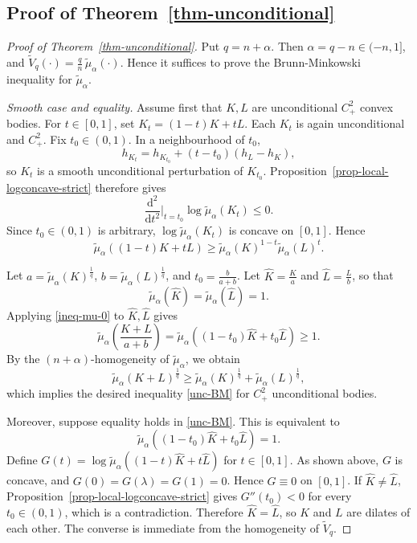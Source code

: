 \documentclass[12pt,leqno]{amsart}
\theoremstyle{plain} \newtheorem{thm}{Theorem}[section]
\theoremstyle{plain} \newtheorem{prop}[thm]{Proposition}
\theoremstyle{plain} \newtheorem{prob}[thm]{Problem}
\theoremstyle{definition} \newtheorem{defi}[thm]{Definition}
\theoremstyle{plain} \newtheorem{cor}[thm]{Corollary}
\theoremstyle{plain} \newtheorem{lem}[thm]{Lemma}
\theoremstyle{plain} \newtheorem{eg}{Example}[section]
\theoremstyle{remark} \newtheorem{rmk}[thm]{Remark}
\theoremstyle{plain} \newtheorem{conj}{Conjecture}
\numberwithin{equation}{section}
\newcommand{\tV}{\widetilde V}
\begin{document}
\subsection{Proof of Theorem~\ref{thm-unconditional}}
\label{sec-proof-unc-BM}

\begin{proof}[Proof of Theorem~\ref{thm-unconditional}]
  Put \(q=n+\alpha\). Then \(\alpha=q-n\in(-n,1]\), and $ \tV_q(\cdot)=\frac qn\,\tilde{\mu}_\alpha(\cdot).$
  Hence it suffices to prove the Brunn-Minkowski inequality for
  \(\tilde{\mu}_\alpha\).

  \emph{Smooth case and equality.}
  Assume first that \(K,L\) are unconditional \(C^2_+\) convex bodies.
  For \(t\in[0,1]\), set $K_t=(1-t)K+tL$.
  Each \(K_t\) is again unconditional and \(C^2_+\).  Fix \(t_0\in(0,1)\).
  In a neighbourhood of \(t_0\),
  \[
    h_{K_t}=h_{K_{t_0}}+(t-t_0)(h_L-h_K),
  \]
  so \(K_t\) is a smooth unconditional perturbation of \(K_{t_0}\).  Proposition~\ref{prop-local-logconcave-strict} therefore
  gives
  \[
    \frac{\mathrm d^2}{\mathrm dt^2}\Big|_{t=t_0}
    \log\tilde{\mu}_\alpha(K_t)\le0.
  \]
  Since \(t_0\in(0,1)\) is arbitrary,
  \(\log\tilde{\mu}_\alpha(K_t)\) is concave on \([0,1]\). Hence
  \begin{equation}\label{ineq-mu-0}
       \tilde{\mu}_\alpha((1-t)K+tL)
    \ge
    \tilde{\mu}_\alpha(K)^{1-t}\tilde{\mu}_\alpha(L)^t.
  \end{equation}
  
   Let $a=\tilde{\mu}_\alpha(K)^{\frac1q}$, $b=\tilde{\mu}_\alpha(L)^{\frac1q}$, and $t_0=\frac{b}{a+b}$. Let $\widehat K=\frac{K}{a}$ and $\widehat L=\frac{L}{b}$, so that
  \[
    \tilde{\mu}_\alpha(\widehat K)=\tilde{\mu}_\alpha(\widehat L)=1.
  \]
  Applying \eqref{ineq-mu-0} to \(\widehat K,\widehat L\) gives
  \[
    \tilde{\mu}_\alpha\!\left(\frac{K+L}{a+b}\right)
    =
    \tilde{\mu}_\alpha((1-t_0)\widehat K+t_0\widehat L)
    \ge 1.
  \]
  By the \((n+\alpha)\)-homogeneity of \(\tilde{\mu}_\alpha\), we obtain
  \[
    \tilde{\mu}_\alpha(K+L)^{\frac1q}
    \ge
    \tilde{\mu}_\alpha(K)^{\frac1q}
    +
    \tilde{\mu}_\alpha(L)^{\frac1q},
  \]
    which implies the desired inequality \eqref{unc-BM} for \(C^2_+\) unconditional bodies.

    Moreover, suppose equality holds in \eqref{unc-BM}. This is equivalent to
  \[
    \tilde{\mu}_\alpha((1-t_0)\widehat K+t_0\widehat L)=1.
  \]
  Define $G(t)=\log\tilde{\mu}_\alpha((1-t)\widehat K+t\widehat L)$ for $t\in[0,1]$.  As shown above, \(G\) is concave, and $G(0)=G(\lambda)=G(1)=0$. Hence \(G\equiv0\) on \([0,1]\). 
  If \(\widehat K\neq\widehat L\),
  Proposition~\ref{prop-local-logconcave-strict} gives
  \(G''(t_0)<0\) for every \(t_0\in(0,1)\), which is a contradiction.
  Therefore \(\widehat K=\widehat L\), so \(K\) and \(L\) are dilates of each other.
  The converse is immediate from the homogeneity of \(\tV_q\).
  

\end{proof}
\end{document}
